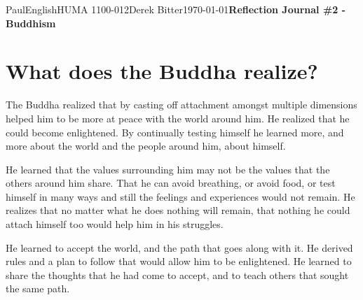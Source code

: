 \documentclass[12pt,letterpaper]{article}
\begin{document}
\begin{mla}{Paul}{English}{HUMA 1100-012}{Derek Bitter}{\today}{\textbf{Reflection Journal \#2 - Buddhism}}

\section{What does the Buddha realize?}







The Buddha realized that by casting off attachment amongst multiple
dimensions helped him to be more at peace with the world around him.
He realized that he could become enlightened. By continually testing
himself he learned more, and more about the world and the people
around him, about himself.

He learned that the values surrounding him may not be the values that
the others around him share. That he can avoid breathing, or avoid
food, or test himself in many ways and still the feelings and
experiences would not remain. He realizes that no matter what he does
nothing will remain, that nothing he could attach himself too would
help him in his struggles.

He learned to accept the world, and the path that goes along with it.
He derived rules and a plan to follow that would allow him to be
enlightened. He learned to share the thoughts that he had come to
accept, and to teach others that sought the same path.





\end{mla}
\end{document}
